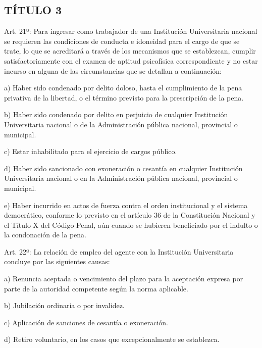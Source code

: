 \documentclass[]{article}
\begin{document}
\subsection{TÍTULO 3}\label{tuxedtulo-3}


Art. 21º: Para ingresar como trabajador de una Institución Universitaria
nacional se requieren las condiciones de conducta e idoneidad para el
cargo de que se trate, lo que se acreditará a través de los mecanismos
que se establezcan, cumplir satisfactoriamente con el examen de aptitud
psicofísica correspondiente y no estar incurso en alguna de las
circunstancias que se detallan a continuación:

a) Haber sido condenado por delito doloso, hasta el cumplimiento de la
pena privativa de la libertad, o el término previsto para la
prescripción de la pena.

b) Haber sido condenado por delito en perjuicio de cualquier Institución
Universitaria nacional o de la Administración pública nacional,
provincial o municipal.

c) Estar inhabilitado para el ejercicio de cargos público.

d) Haber sido sancionado con exoneración o cesantía en cualquier
Institución Universitaria nacional o en la Administración pública
nacional, provincial o municipal.

e) Haber incurrido en actos de fuerza contra el orden institucional y el
sistema democrático, conforme lo previsto en el artículo 36 de la
Constitución Nacional y el Título X del Código Penal, aún cuando se
hubieren beneficiado por el indulto o la condonación de la pena.

Art. 22º: La relación de empleo del agente con la Institución
Universitaria concluye por las siguientes causas:

a) Renuncia aceptada o vencimiento del plazo para la aceptación expresa
por parte de la autoridad competente según la norma aplicable.

b) Jubilación ordinaria o por invalidez.

c) Aplicación de sanciones de cesantía o exoneración.

d) Retiro voluntario, en los casos que excepcionalmente se establezca.
\end{document}
